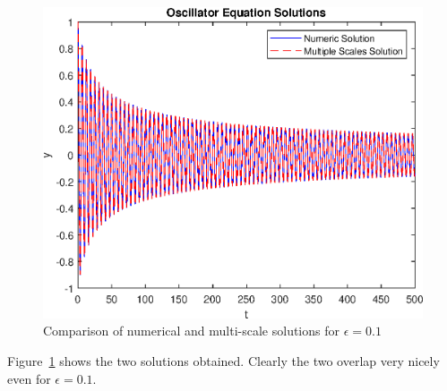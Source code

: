 \documentclass{X:/Documents/Coding/Latex/myassignment}
\begin{document}
\begin{enumerate}
	\begin{figure}[h]
		\centering
		\label{fig:q1}
		\includegraphics[width=\linewidth]{TopicCA4Q1.eps}
		\caption{Comparison of numerical and multi-scale solutions for $\epsilon = 0.1$}
	\end{figure}


	Figure~\ref{fig:q1} shows the two solutions obtained. Clearly the two overlap very nicely even for $\epsilon=0.1$. 


\end{enumerate}
\end{document}
